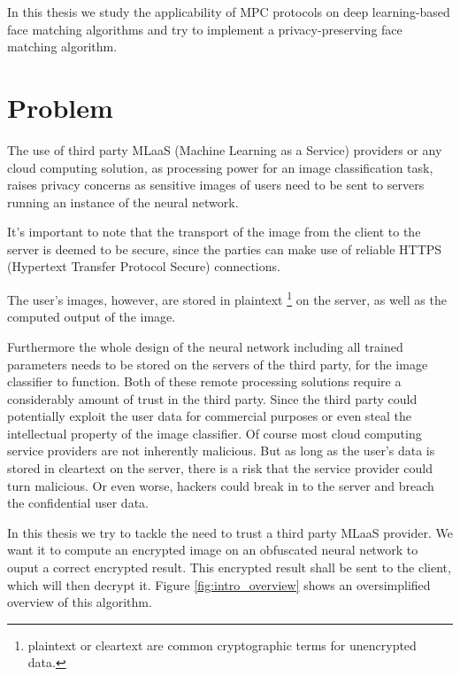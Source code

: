 In this thesis we study the applicability of MPC protocols on deep learning-based face matching algorithms and try to implement a privacy-preserving face matching algorithm.

\section{Problem}
The use of third party MLaaS (Machine Learning as a Service) providers or any cloud computing solution, as processing power for an image classification task, raises privacy concerns as sensitive images of users need to be sent to servers running an instance of the neural network.

It's important to note that the transport of the image from the client to the server is deemed to be secure, since the parties can make use of reliable HTTPS (Hypertext Transfer Protocol Secure) connections.

The user's images, however, are stored in plaintext \footnote{plaintext or cleartext are common cryptographic terms for unencrypted data.} on the server, as well as the computed output of the image.

Furthermore the whole design of the neural network including all trained parameters needs to be stored on the servers of the third party, for the image classifier to function. Both of these remote processing solutions require a considerably amount of trust in the third party. Since the third party could potentially exploit the user data for commercial purposes or even steal the intellectual property of the image classifier. Of course most cloud computing service providers are not inherently malicious. But as long as the user's data is stored in cleartext on the server, there is a risk that the service provider could turn malicious. Or even worse, hackers could break in to the server and breach the confidential user data.

In this thesis we try to tackle the need to trust a third party MLaaS provider. We want it to compute an encrypted image on an obfuscated neural network to ouput a correct encrypted result. This encrypted result shall be sent to the client, which will then decrypt it. Figure \ref{fig:intro_overview} shows an oversimplified overview of this algorithm.

